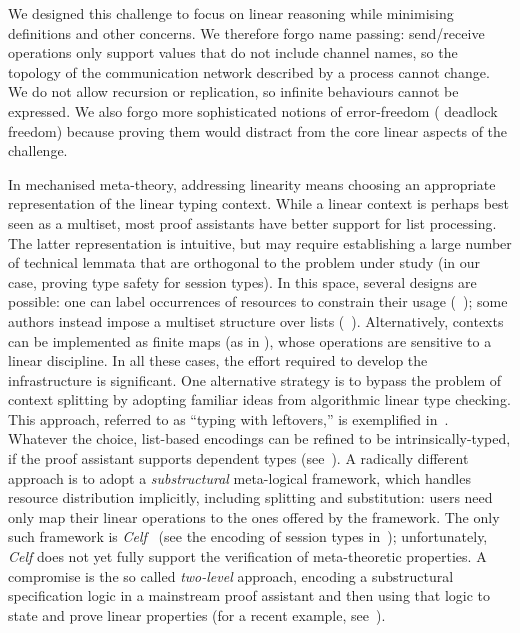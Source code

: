 \documentclass[runningheads]{llncs}
\begin{document}
We designed this challenge to focus on linear reasoning while minimising
definitions and other concerns.  We therefore forgo name passing:
send/receive operations only support values that do not include channel names, so
the topology of the communication network described by a process cannot change.
We do not allow recursion or replication, so infinite behaviours cannot be
expressed. We also forgo more sophisticated notions of error-freedom (\eg
deadlock freedom) because proving them would distract from the core linear
aspects of the challenge.

In mechanised meta-theory, addressing linearity means choosing an appropriate
representation of the linear typing context.  While a linear context is perhaps
best seen as a multiset, most proof assistants have better support for list
processing.  The latter representation is intuitive, but may require
establishing a large number of technical lemmata that are orthogonal to the
problem under study (in our case, proving type safety for
session types).  In this space, several designs are possible: one can label
occurrences of resources to constrain their usage (\eg~\cite{CicconeP20}); some
authors instead impose a multiset structure over lists
(\eg~\cite{Danielsson12,ChaudhuriLR19}). Alternatively, contexts can be
implemented as finite maps (as in \cite{Castro2020}), whose operations are
sensitive to a linear discipline. In all these cases, the effort required to
develop the infrastructure is significant.
%
One alternative strategy is to bypass the problem of context splitting
by adopting familiar ideas from algorithmic linear type checking. This
approach, referred to as ``typing with leftovers,'' is exemplified
in~\cite{DBLP:conf/forte/ZalakainD21}.  Whatever the choice,
list-based encodings can be refined to be intrinsically-typed, if the
proof assistant supports dependent types
(see~\cite{Thiemann2019,CicconeP20,RouvoetPKV20}).
%
A radically different approach is to adopt a \emph{substructural}
meta-logical framework, which handles resource
distribution implicitly, including splitting and
substitution: users need only map their linear operations to the
ones offered by the framework.  The only such framework is
\emph{Celf}~\cite{Schack-Nielsen:IJCAR08} (see the encoding of session
types in~\cite{Bock2016}); unfortunately, \emph{Celf} does not yet
fully support the verification of meta-theoretic properties.  A
compromise is the so called \emph{two-level} approach, \ie encoding a
substructural specification logic in a mainstream proof assistant and
then using that logic to state and prove linear properties (for a
recent example, see~\cite{Felty:MSCS21}).
\end{document}
